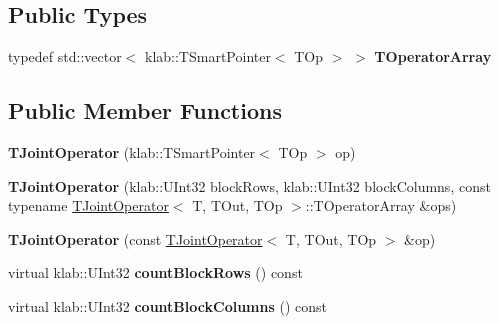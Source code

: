 \subsection*{Public Types}
\begin{DoxyCompactItemize}
\item 
typedef std\+::vector$<$ klab\+::\+T\+Smart\+Pointer$<$ T\+Op $>$ $>$ {\bfseries T\+Operator\+Array}\hypertarget{classkl1p_1_1TJointOperator_a6c2bb51863499482f5a88854dd4bcd76}{}\label{classkl1p_1_1TJointOperator_a6c2bb51863499482f5a88854dd4bcd76}

\end{DoxyCompactItemize}
\subsection*{Public Member Functions}
\begin{DoxyCompactItemize}
\item 
{\bfseries T\+Joint\+Operator} (klab\+::\+T\+Smart\+Pointer$<$ T\+Op $>$ op)\hypertarget{classkl1p_1_1TJointOperator_ac501eb34d05431292f1fcb18a1ecd8c1}{}\label{classkl1p_1_1TJointOperator_ac501eb34d05431292f1fcb18a1ecd8c1}

\item 
{\bfseries T\+Joint\+Operator} (klab\+::\+U\+Int32 block\+Rows, klab\+::\+U\+Int32 block\+Columns, const typename \hyperlink{classkl1p_1_1TJointOperator}{T\+Joint\+Operator}$<$ T, T\+Out, T\+Op $>$\+::T\+Operator\+Array \&ops)\hypertarget{classkl1p_1_1TJointOperator_adf0afae3bd21a2765bd0189e2eda7ef7}{}\label{classkl1p_1_1TJointOperator_adf0afae3bd21a2765bd0189e2eda7ef7}

\item 
{\bfseries T\+Joint\+Operator} (const \hyperlink{classkl1p_1_1TJointOperator}{T\+Joint\+Operator}$<$ T, T\+Out, T\+Op $>$ \&op)\hypertarget{classkl1p_1_1TJointOperator_ac9a60eeb6bf92ed988d3d2a5d83ecdfd}{}\label{classkl1p_1_1TJointOperator_ac9a60eeb6bf92ed988d3d2a5d83ecdfd}

\item 
virtual klab\+::\+U\+Int32 {\bfseries count\+Block\+Rows} () const \hypertarget{classkl1p_1_1TJointOperator_a28a2f5c7f78e485620251e7e446d3d81}{}\label{classkl1p_1_1TJointOperator_a28a2f5c7f78e485620251e7e446d3d81}

\item 
virtual klab\+::\+U\+Int32 {\bfseries count\+Block\+Columns} () const \hypertarget{classkl1p_1_1TJointOperator_a8f70f4777040165a5d0170708803e243}{}\label{classkl1p_1_1TJointOperator_a8f70f4777040165a5d0170708803e243}


\end{DoxyCompactItemize}
